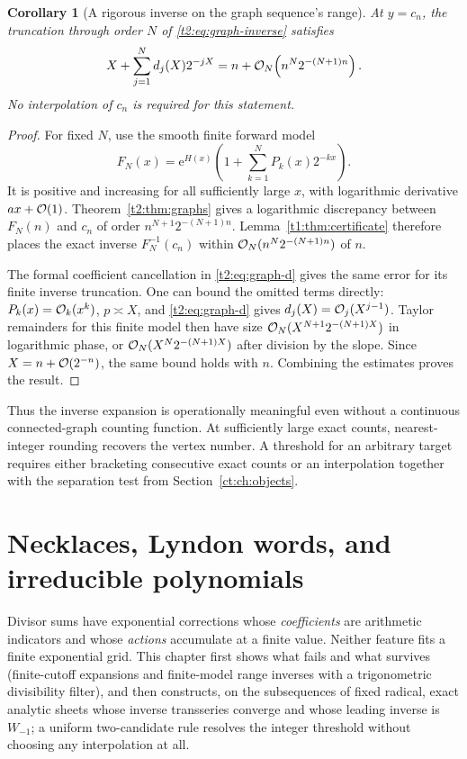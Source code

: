 \documentclass[11pt,openany]{book}
\numberwithin{equation}{chapter}
\theoremstyle{plain}
\newtheorem{corollary}[theorem]{Corollary}
\theoremstyle{definition}
\theoremstyle{remark}
\newcommand{\ee}{\mathrm e}
\begin{document}
\begin{corollary}[A rigorous inverse on the graph sequence's range]
\label{t2:cor:graph-range}
At $y=c_n$, the truncation through order $N$ of \eqref{t2:eq:graph-inverse} satisfies
\begin{equation}
 X+\sum_{j=1}^Nd_j(X)2^{-jX}
 =n+\mathcal O_N\!\left(n^N2^{-(N+1)n}\right).
 \label{t2:eq:graph-range-error}
\end{equation}
No interpolation of $c_n$ is required for this statement.
\end{corollary}
\begin{proof}
For fixed $N$, use the smooth finite forward model
\[
 F_N(x)=\ee^{H(x)}\left(1+\sum_{k=1}^NP_k(x)2^{-kx}\right).
\]
It is positive and increasing for all sufficiently large $x$, with logarithmic derivative $ax+\mathcal O(1)$. Theorem~\ref{t2:thm:graphs} gives a logarithmic discrepancy between $F_N(n)$ and $c_n$ of order $n^{N+1}2^{-(N+1)n}$. Lemma~\ref{t1:thm:certificate} therefore places the exact inverse $F_N^{-1}(c_n)$ within $\mathcal O_N(n^N2^{-(N+1)n})$ of $n$.

The formal coefficient cancellation in \eqref{t2:eq:graph-d} gives the same error for its finite inverse truncation. One can bound the omitted terms directly: $P_k(x)=\mathcal O_k(x^k)$, $p\asymp X$, and \eqref{t2:eq:graph-d} gives $d_j(X)=\mathcal O_j(X^{j-1})$. Taylor remainders for this finite model then have size $\mathcal O_N(X^{N+1}2^{-(N+1)X})$ in logarithmic phase, or $\mathcal O_N(X^N2^{-(N+1)X})$ after division by the slope. Since $X=n+\mathcal O(2^{-n})$, the same bound holds with $n$. Combining the estimates proves the result.
\end{proof}

Thus the inverse expansion is operationally meaningful even without a continuous connected-graph counting function. At sufficiently large exact counts, nearest-integer rounding recovers the vertex number. A threshold for an arbitrary target requires either bracketing consecutive exact counts or an interpolation together with the separation test from Section~\ref{ct:ch:objects}.

\chapter{Necklaces, Lyndon words, and irreducible polynomials}
\label{ct:ch:necklaces}

Divisor sums have exponential corrections whose \emph{coefficients} are
arithmetic indicators and whose \emph{actions} accumulate at a finite
value.  Neither feature fits a finite exponential grid.  This chapter first
shows what fails and what survives (finite-cutoff expansions and
finite-model range inverses with a trigonometric divisibility filter), and
then constructs, on the subsequences of fixed radical, exact analytic sheets
whose inverse transseries converge and whose leading inverse is $W_{-1}$;
a uniform two-candidate rule resolves the integer threshold without
choosing any interpolation at all.
\end{document}
